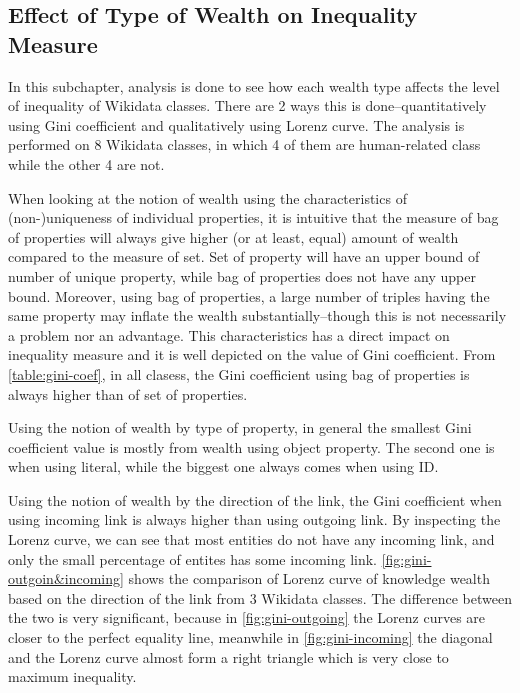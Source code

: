 \subsection{Effect of Type of Wealth on Inequality Measure} \label{wealth & gini}

% 
% 
% 

In this subchapter, analysis is done to see how each wealth type affects the level of inequality of Wikidata classes. There are 2 ways this is done--quantitatively using Gini coefficient and qualitatively using Lorenz curve. The analysis is performed on 8 Wikidata classes, in which 4 of them are human-related class while the other 4 are not.

When looking at the notion of wealth using the characteristics of (non-)uniqueness of individual properties, it is intuitive that the measure of bag of properties will always give higher (or at least, equal) amount of wealth compared to the measure of set. Set of property will have an upper bound of number of unique property, while bag of properties does not have any upper bound. Moreover, using bag of properties, a large number of triples having the same property may inflate the wealth substantially--though this is not necessarily a problem nor an advantage. This characteristics has a direct impact on inequality measure and it is well depicted on the value of Gini coefficient. From \autoref{table:gini-coef}, in all clasess, the Gini coefficient using bag of properties is always higher than of set of properties.

Using the notion of wealth by type of property, in general the smallest Gini coefficient value is mostly from wealth using object property. The second one is when using literal, while the biggest one always comes when using ID.

Using the notion of wealth by the direction of the link, the Gini coefficient when using incoming link is always higher than using outgoing link. By inspecting the Lorenz curve, we can see that most entities do not have any incoming link, and only the small percentage of entites has some incoming link. \autoref{fig:gini-outgoin&incoming} shows the comparison of Lorenz curve of knowledge wealth based on the direction of the link from 3 Wikidata classes. The difference between the two is very significant, because in \autoref{fig:gini-outgoing} the Lorenz curves are closer to the perfect equality line, meanwhile in \autoref{fig:gini-incoming} the diagonal and the Lorenz curve almost form a right triangle which is very close to maximum inequality.

